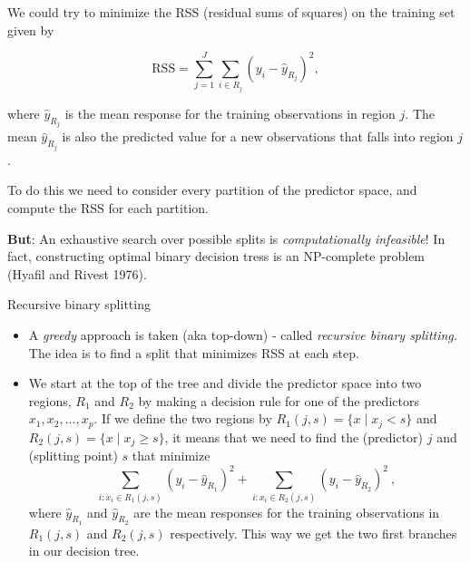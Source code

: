 \documentclass[10pt,ignorenonframetext,]{beamer}
\begin{document}
\begin{frame}

We could try to minimize the RSS (residual sums of squares) on the
training set given by

\[
\text{RSS}=\sum_{j=1}^J \sum_{i \in R_j}(y_i-\hat{y}_{R_j})^2,
\]

where \(\hat{y}_{R_j}\) is the mean response for the training
observations in region \(j\). The mean \(\hat{y}_{R_j}\) is also the
predicted value for a new observations that falls into region \(j\).

To do this we need to consider every partition of the predictor space,
and compute the RSS for each partition.

\textbf{But}: An exhaustive search over possible splits is
\emph{computationally infeasible}! In fact, constructing optimal binary
decision tress is an NP-complete problem (Hyafil and Rivest 1976).

\end{frame}

\begin{frame}

\begin{block}{Recursive binary splitting}

\vspace{2mm}

\begin{itemize}
\item
  A \emph{greedy} approach is taken (aka top-down) - called
  \emph{recursive binary splitting.} The idea is to find a split that
  minimizes RSS at each step.
\item
  We start at the top of the tree and divide the predictor space into
  two regions, \(R_1\) and \(R_2\) by making a decision rule for one of
  the predictors \(x_1, x_2,...,x_p\). If we define the two regions by
  \(R_1(j,s)=\{x \mid x_j<s\}\) and \(R_2(j,s)=\{x \mid x_j\geq s\}\),
  it means that we need to find the (predictor) \(j\) and (splitting
  point) \(s\) that minimize
  \[\sum_{i: x_i \in R_1(j,s)}(y_i-\hat{y}_{R_1})^2+\sum_{i: x_i \in R_2(j,s)}(y_i -\hat{y}_{R_2})^2 \ ,\]
  where \(\hat{y}_{R_1}\) and \(\hat{y}_{R_2}\) are the mean responses
  for the training observations in \(R_1(j,s)\) and \(R_2(j,s)\)
  respectively. This way we get the two first branches in our decision
  tree.
\end{itemize}

\end{block}

\end{frame}
\end{document}
